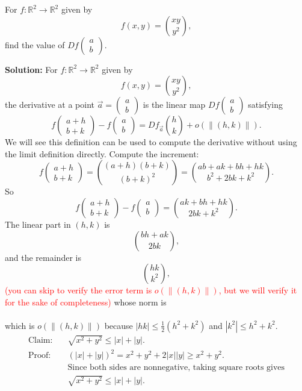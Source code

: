 \begin{example}
For $f:\mathbb{R}^2\to\mathbb{R}^2$ given by
\[
f(x,y)=\binom{xy}{y^2},
\]
find the value of $Df\begin{pmatrix}
a \\ b
\end{pmatrix}$.
\end{example}
\textbf{Solution:} For $f:\mathbb{R}^2\to\mathbb{R}^2$ given by
\[
f(x,y)=\binom{xy}{y^2},
\]
the derivative at a point $\vec a=\begin{pmatrix}a\\b\end{pmatrix}$ is the linear map $Df\begin{pmatrix}
a\\b
\end{pmatrix}$ satisfying
\[
f\begin{pmatrix}a+h\\b+k\end{pmatrix}-f\begin{pmatrix}a\\b\end{pmatrix}=Df_{\vec a}\binom{h}{k}+o(\|(h,k)\|).
\]
We will see this definition can be used to compute the derivative without using the limit definition directly.
Compute the increment:
\[
f\begin{pmatrix}a+h\\b+k\end{pmatrix}=\binom{(a+h)(b+k)}{(b+k)^2}
=\binom{ab+ak+bh+hk}{b^2+2bk+k^2}.
\]
So
\[
f\begin{pmatrix}a+h\\b+k\end{pmatrix}-f\begin{pmatrix}a\\b\end{pmatrix}=\binom{ak+bh+hk}{2bk+k^2}.
\]
The linear part in $(h,k)$ is
\[
\binom{bh+ak}{2bk},
\]
and the remainder is
\[
\binom{hk}{k^2},
\]
\textcolor{red}{(you can skip to verify the error term is $o(\|(h,k)\|)$, but we will verify it for the sake of completeness)} whose norm is
\\
~\\
which is $o(\|(h,k)\|)$ because $|hk|\le \tfrac12(h^2+k^2)$ and $|k^2|\le h^2+k^2$.
\[
\boxed{
\begin{aligned}
\text{Claim:}\quad &\sqrt{x^2+y^2}\le |x|+|y|.\\[4pt]
\text{Proof:}\quad 
&(|x|+|y|)^2
= x^2+y^2+2|x||y|
\ge x^2+y^2.\\[4pt]
&\text{Since both sides are nonnegative, taking square roots gives}\\[4pt]
&\sqrt{x^2+y^2}\le |x|+|y|.
\end{aligned}
}
\]
